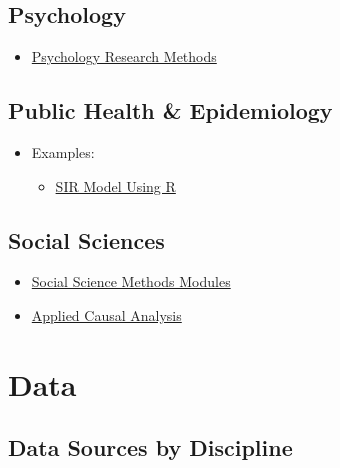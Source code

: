 \documentclass[]{book}
\providecommand{\tightlist}{%
  \setlength{\itemsep}{0pt}\setlength{\parskip}{0pt}}
\begin{document}
\hypertarget{psychology}{%
\section*{Psychology}\label{psychology}}

\begin{itemize}
\tightlist
\item
  \href{https://www.simplypsychology.org/qualitative-quantitative.html}{Psychology Research Methods}
\end{itemize}

\hypertarget{public-health-epidemiology}{%
\section*{Public Health \& Epidemiology}\label{public-health-epidemiology}}

\begin{itemize}
\item
  Examples:

  \begin{itemize}
  \tightlist
  \item
    \href{https://rpubs.com/choisy/sir}{SIR Model Using R}
  \end{itemize}
\end{itemize}

\hypertarget{social-sciences}{%
\section*{Social Sciences}\label{social-sciences}}

\begin{itemize}
\tightlist
\item
  \href{https://modu.ssri.duke.edu/}{Social Science Methods Modules}
\item
  \href{https://bookdown.org/paulcbauer/causal_analysis/}{Applied Causal Analysis}
\end{itemize}

\hypertarget{data}{%
\chapter{Data}\label{data}}

\hypertarget{data-sources-by-discipline}{%
\section{Data Sources by Discipline}\label{data-sources-by-discipline}}
\end{document}
